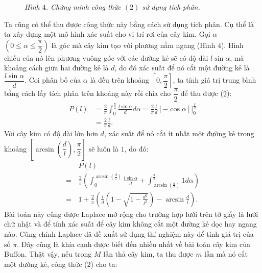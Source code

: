 \begin{multicols}{2}
\begin{figure}[H]
		\caption{\small\textit{\color{toanhocdoisong}Hình $4$. Chứng minh công thức $(2)$ sử dụng tích phân.}}
		\vspace*{-10pt}
	\end{figure}
	Ta cũng có thể thu được công thức này bằng cách sử dụng tích phân. Cụ thể là ta xây dựng một mô hình xác suất cho vị trí rơi của cây kim. Gọi $\alpha$ $(0\le \alpha \le \dfrac{\pi}{2})$ là góc mà cây kim tạo với phương nằm ngang (Hình $4$). Hình chiếu của nó lên phương vuông góc với các đường kẻ sẽ có độ dài $l\sin\alpha$, mà khoảng cách giữa hai đường kẻ là $d$, do đó xác suất để nó cắt một đường kẻ là $\dfrac{l\sin\alpha}{d}$. Coi phân bố của $\alpha$ là đều trên khoảng $[0,\dfrac{\pi}{2}]$, ta tính giá trị trung bình bằng cách lấy tích phân trên khoảng này rồi chia cho $\dfrac{\pi}{2}$ để thu được ($2$):
	\begin{align*}
		P(l) &= \frac{2}{\pi }\int_0^{\frac{\pi }{2}} {\frac{{l\sin \alpha }}{d}} d\alpha  = \frac{2}{\pi }\frac{l}{d}\left[ { - \cos \alpha } \right]|_0^{\frac{\pi }{2}}\\
		& = \frac{2}{\pi }\frac{l}{d}.
	\end{align*}
	Với cây kim có độ dài lớn hơn $d$, xác suất để nó cắt ít nhất một đường kẻ trong khoảng $\left[\arcsin\left(\dfrac{d}{l}\right), \dfrac{\pi}{2}\right]$ sẽ luôn là $1$, do đó:
	\begin{align*}
		&P(l) \\
		= \,&\frac{2}{\pi }\left( {\int_0^{\arcsin \left( {\frac{d}{l}} \right)} {\frac{{l\sin \alpha }}{d} + } \int_{\arcsin \left( {\frac{d}{l}} \right)}^{\frac{\pi }{2}} {1d\alpha } } \right)\\
		=\,&1 \!\!+\!\! \frac{2}{\pi }\!\left( \!\!{\frac{l}{d}\!\!\left(\!\! {1 \!-\! \sqrt {\!\!1 \!-\! \frac{{{d^2}}}{{{l^2}}}} \!} \right) \!\!-\! \arcsin\! \frac{d}{l}}\! \right)\!\!.\tag{$3$}
	\end{align*}
	Bài toán này cũng được Laplace mở rộng cho trường hợp lưới trên tờ giấy là lưới chữ nhật và để tính xác suất để cây kim không cắt một đường kẻ dọc hay ngang nào. 
	\vskip 0.1cm
	Cũng chính Laplace đã đề xuất sử dụng thí nghiệm này để tính giá trị của số $\pi$. Đây cũng là khía cạnh được biết đến nhiều nhất về bài toán cây kim của Buffon. Thật vậy, nếu trong $M$ lần thả cây kim, ta thu được $m$ lần mà nó cắt một đường kẻ, công thức ($2$) cho ta:

\end{multicols}
